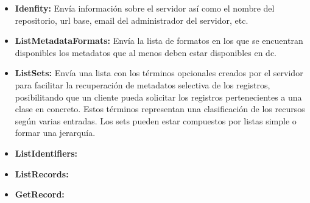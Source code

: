 \begin{itemize}
	\item \textbf{Idenfity:} Envía información sobre el servidor así como el nombre del repositorio, \acrshort{url} base, email del administrador del servidor, etc.
	\item \textbf{ListMetadataFormats:} Envía la lista de formatos en los que se encuentran disponibles los metadatos que al menos deben estar disponibles en \acrshort{dc}.
	\item \textbf{ListSets:} Envía una lista con los términos opcionales creados por el servidor para facilitar la recuperación de metadatos selectiva de los registros, posibilitando que un cliente pueda solicitar los registros pertenecientes a una clase en concreto. Estos términos representan una clasificación de los recursos según varias entradas. Los sets pueden estar compuestos por listas simple o formar una jerarquía.
	\item \textbf{ListIdentifiers:}
	\item \textbf{ListRecords:}
	\item \textbf{GetRecord:}
\end{itemize}